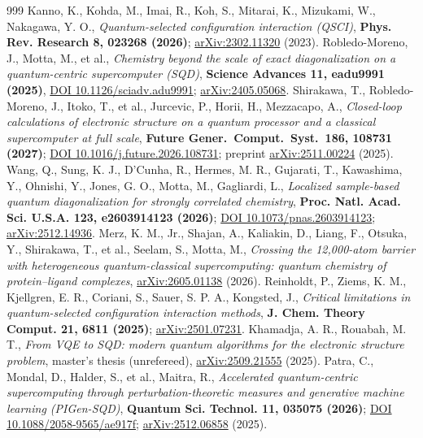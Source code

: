 \documentclass[onecolumn,a4paper]{quantumarticle}
\begin{document}
\begin{thebibliography}{999}
 Kanno, K., Kohda, M., Imai, R., Koh, S., Mitarai, K., Mizukami, W., Nakagawa, Y. O., \emph{Quantum-selected configuration interaction (QSCI)}, \textbf{Phys. Rev. Research 8, 023268 (2026)}; \href{https://arxiv.org/abs/2302.11320}{arXiv:2302.11320} (2023).
 Robledo-Moreno, J., Motta, M., et al., \emph{Chemistry beyond the scale of exact diagonalization on a quantum-centric supercomputer (SQD)}, \textbf{Science Advances 11, eadu9991 (2025)}, \href{https://doi.org/10.1126/sciadv.adu9991}{DOI 10.1126/sciadv.adu9991}; \href{https://arxiv.org/abs/2405.05068}{arXiv:2405.05068}.
 Shirakawa, T., Robledo-Moreno, J., Itoko, T., et al., Jurcevic, P., Horii, H., Mezzacapo, A., \emph{Closed-loop calculations of electronic structure on a quantum processor and a classical supercomputer at full scale}, \textbf{Future Gener.\ Comput.\ Syst.\ 186, 108731 (2027)}; \href{https://doi.org/10.1016/j.future.2026.108731}{DOI 10.1016/j.future.2026.108731}; preprint \href{https://arxiv.org/abs/2511.00224}{arXiv:2511.00224} (2025).
 Wang, Q., Sung, K. J., D'Cunha, R., Hermes, M. R., Gujarati, T., Kawashima, Y., Ohnishi, Y., Jones, G. O., Motta, M., Gagliardi, L., \emph{Localized sample-based quantum diagonalization for strongly correlated chemistry}, \textbf{Proc. Natl. Acad. Sci. U.S.A. 123, e2603914123 (2026)}; \href{https://doi.org/10.1073/pnas.2603914123}{DOI 10.1073/pnas.2603914123}; \href{https://arxiv.org/abs/2512.14936}{arXiv:2512.14936}.
 Merz, K. M., Jr., Shajan, A., Kaliakin, D., Liang, F., Otsuka, Y., Shirakawa, T., et al., Seelam, S., Motta, M., \emph{Crossing the 12,000-atom barrier with heterogeneous quantum-classical supercomputing: quantum chemistry of protein--ligand complexes}, \href{https://arxiv.org/abs/2605.01138}{arXiv:2605.01138} (2026).
 Reinholdt, P., Ziems, K. M., Kjellgren, E. R., Coriani, S., Sauer, S. P. A., Kongsted, J., \emph{Critical limitations in quantum-selected configuration interaction methods}, \textbf{J. Chem. Theory Comput. 21, 6811 (2025)}; \href{https://arxiv.org/abs/2501.07231}{arXiv:2501.07231}.
 Khamadja, A. R., Rouabah, M. T., \emph{From VQE to SQD: modern quantum algorithms for the electronic structure problem}, master's thesis (unrefereed), \href{https://arxiv.org/abs/2509.21555}{arXiv:2509.21555} (2025).
 Patra, C., Mondal, D., Halder, S., et al., Maitra, R., \emph{Accelerated quantum-centric supercomputing through perturbation-theoretic measures and generative machine learning (PIGen-SQD)}, \textbf{Quantum Sci. Technol. 11, 035075 (2026)}; \href{https://doi.org/10.1088/2058-9565/ae917f}{DOI 10.1088/2058-9565/ae917f}; \href{https://arxiv.org/abs/2512.06858}{arXiv:2512.06858} (2025).

\end{thebibliography}
\end{document}
